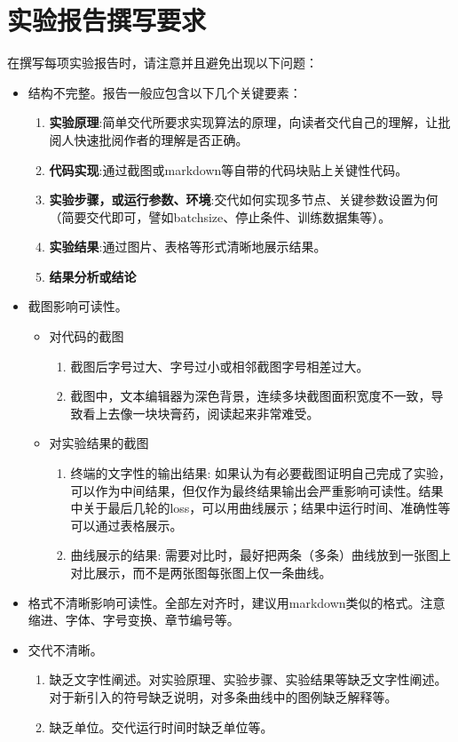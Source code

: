 \chapter{实验报告撰写要求}
在撰写每项实验报告时，请注意并且避免出现以下问题：
\begin{itemize}
    \item 结构不完整。报告一般应包含以下几个关键要素：
    \begin{enumerate}
    \item \textbf{实验原理}:简单交代所要求实现算法的原理，向读者交代自己的理解，让批阅人快速批阅作者的理解是否正确。
    \item \textbf{代码实现}:通过截图或markdown等自带的代码块贴上关键性代码。
    \item \textbf{实验步骤，或运行参数、环境}:交代如何实现多节点、关键参数设置为何（简要交代即可，譬如batchsize、停止条件、训练数据集等）。
    \item \textbf{实验结果}:通过图片、表格等形式清晰地展示结果。
    \item \textbf{结果分析或结论}
    \end{enumerate}

    \item 截图影响可读性。
    \begin{itemize}
        \item 对代码的截图
        \begin{enumerate}
            \item 截图后字号过大、字号过小或相邻截图字号相差过大。
            \item 截图中，文本编辑器为深色背景，连续多块截图面积宽度不一致，导致看上去像一块块膏药，阅读起来非常难受。
        \end{enumerate}
        \item 对实验结果的截图
        \begin{enumerate}
            \item 终端的文字性的输出结果: 如果认为有必要截图证明自己完成了实验，可以作为中间结果，但仅作为最终结果输出会严重影响可读性。结果中关于最后几轮的loss，可以用曲线展示；结果中运行时间、准确性等可以通过表格展示。
            \item 曲线展示的结果: 需要对比时，最好把两条（多条）曲线放到一张图上对比展示，而不是两张图每张图上仅一条曲线。
        \end{enumerate}
    \end{itemize}

    \item 格式不清晰影响可读性。全部左对齐时，建议用markdown类似的格式。注意缩进、字体、字号变换、章节编号等。

    \item 交代不清晰。
    \begin{enumerate}
        \item 缺乏文字性阐述。对实验原理、实验步骤、实验结果等缺乏文字性阐述。对于新引入的符号缺乏说明，对多条曲线中的图例缺乏解释等。
        \item 缺乏单位。交代运行时间时缺乏单位等。
    \end{enumerate}
\end{itemize}

